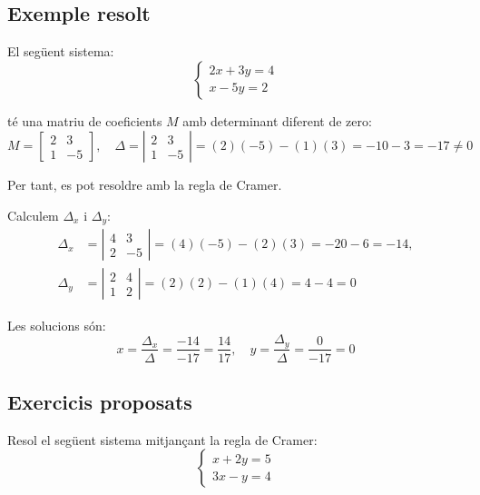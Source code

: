 \documentclass[12pt]{article}
\begin{document}
\subsection*{Exemple resolt}
\begin{exemple}
El següent sistema:
\[
\begin{cases}
2x + 3y = 4 \\
x - 5y = 2
\end{cases}
\]

té una matriu de coeficients \(M\) amb determinant diferent de zero:
\[
M =
\begin{bmatrix}
2 & 3 \\
1 & -5
\end{bmatrix}, \quad
\Delta = \left|
\begin{matrix}
2 & 3 \\
1 & -5
\end{matrix}
\right| = (2)(-5) - (1)(3) = -10 - 3 = -17 \neq 0
\]

Per tant, es pot resoldre amb la regla de Cramer.

Calculem \(\Delta_x\) i \(\Delta_y\):
\begin{align*}
\Delta_x &= \left|
\begin{matrix}
4 & 3 \\
2 & -5
\end{matrix}
\right| = (4)(-5) - (2)(3) = -20 - 6 = -14, \\
\Delta_y &= \left|
\begin{matrix}
2 & 4 \\
1 & 2
\end{matrix}
\right| = (2)(2) - (1)(4) = 4 - 4 = 0
\end{align*}


Les solucions són:
\[
x = \frac{\Delta_x}{\Delta} = \frac{-14}{-17} = \frac{14}{17}, \quad
y = \frac{\Delta_y}{\Delta} = \frac{0}{-17} = 0
\]

\end{exemple}

\subsection*{Exercicis proposats}
\begin{exercici}
Resol el següent sistema mitjançant la regla de Cramer:
\[
\begin{cases}
x + 2y = 5 \\
3x - y = 4
\end{cases}
\]
\end{exercici}
\end{document}
